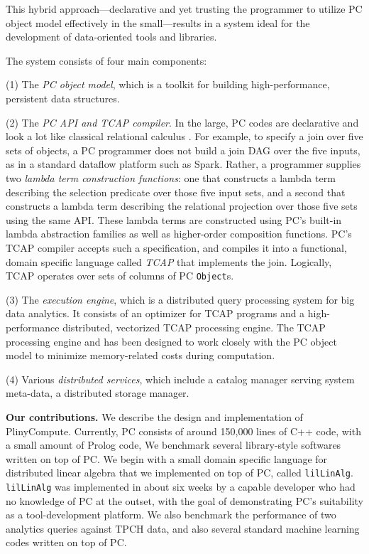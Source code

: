This hybrid approach---declarative and yet trusting the programmer
to utilize PC object model effectively
in the small---results in a system ideal for the 
development of data-oriented tools and libraries.

The system consists of four main components: 

\vspace{3pt}
\noindent
(1) The \emph{PC object model}, which is a toolkit for building high-performance, persistent data structures.

\vspace {3pt}
\noindent
(2) The \emph{PC API and TCAP compiler}.  In the large, PC codes are declarative and look a lot like classical relational calculus \cite{codd1971data}.  For example, to specify a join over five sets of objects, a PC programmer does not build a join DAG over the five inputs, as in a standard
dataflow platform such as Spark.  Rather, a programmer 
supplies two \emph{lambda term construction functions}: one that constructs a lambda term describing the selection
predicate over those five input sets, 
and a second that constructs a lambda term describing the relational projection over those five sets
using the same API.  These lambda terms are constructed using PC's built-in lambda abstraction families as well as higher-order composition functions.
 PC's TCAP compiler 
accepts such a specification, and compiles it into a functional, domain specific language called \emph{TCAP} that implements
the join.  Logically, TCAP operates over
sets of columns of PC \texttt{Object}s. 

\vspace{3pt}
\noindent
(3) The \emph{execution engine}, which is a distributed query processing
  system for big data analytics.
  It consists of an optimizer for TCAP
  programs and a 
high-performance distributed, vectorized TCAP processing engine. 
The TCAP processing engine 
and has been designed to work closely with the PC object model to
minimize memory-related costs during computation.

\vspace{3pt}
\noindent
(4) Various \emph{distributed services}, which include 
a catalog manager serving system meta-data, a
distributed storage manager.



\vspace{8 pt}
\noindent
\textbf{Our contributions.}
We describe the design and implementation of PlinyCompute.  
Currently, PC consists of around
150,000 lines of C++ code, with a small amount of Prolog code,
We benchmark several library-style softwares written on top of PC.  We begin with a small domain specific language
for distributed linear algebra that we implemented on top of PC,
called \texttt{lilLinAlg}.  \texttt{lilLinAlg} was implemented in
about six weeks by a capable developer
who had no knowledge of PC at the outset, with the goal of demonstrating PC's suitability as a tool-development platform.  
We also benchmark the performance of two analytics queries against TPCH
data, and also several standard machine learning codes written on top of PC.
